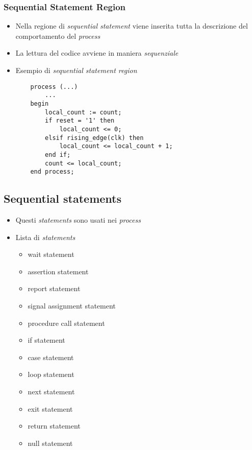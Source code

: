 \documentclass{article}
\begin{document}
\subsubsection{Sequential Statement Region}
\begin{itemize}
	\item Nella regione di \textit{sequential statement} viene inserita tutta la descrizione del comportamento del \textit{process}
	\item La lettura del codice avviene in maniera \textit{sequenziale}
	\newpage
	
	\item Esempio di \textit{sequential statement region}
		\begin{verbatim}
    process (...)
        ...
    begin
        local_count := count;
        if reset = '1' then
            local_count <= 0;
        elsif rising_edge(clk) then
            local_count <= local_count + 1;
        end if;
        count <= local_count;
    end process;
	      \end{verbatim}
\end{itemize}
\subsection{Sequential statements}
\begin{itemize}
	\item Questi \textit{statements} sono usati nei \textit{process}
	\item Lista di \textit{statements}
	      \begin{itemize}
	      	\item wait statement
	      	\item assertion statement
	      	\item report statement
	      	\item signal assignment statement
	      	\item procedure call statement
	      	\item if statement
	      	\item case statement
	      	\item loop statement
	      	\item next statement
	      	\item exit statement
	      	\item return statement
	      	\item null statement
	      \end{itemize}
\end{itemize}
\end{document}
